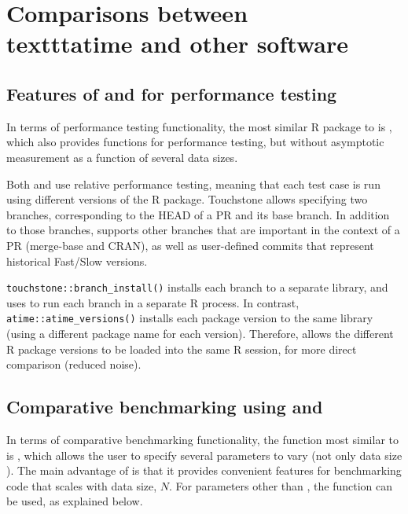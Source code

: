 \section{Comparisons between \\texttt{atime} and other software}

\subsection{Features of  and   for performance testing}

In terms of performance testing functionality, the most similar R package to  is , which also provides functions for performance testing, but without asymptotic measurement as a function of several data sizes. 

Both  and  use relative performance testing, meaning that each test case is run using different versions of the R package.
Touchstone allows specifying two branches, corresponding to the HEAD of a PR and its base branch.
In addition to those branches,  supports other branches that are important in the context of a PR (merge-base and CRAN), as well as user-defined commits that represent historical Fast/Slow versions.

\verb|touchstone::branch_install()| installs each branch to a separate library, and uses  to run each branch in a separate R process.
In contrast, \verb|atime::atime_versions()| installs each package version to the same library (using a different package name for each version).
Therefore,  allows the different R package versions to be loaded into the same R session, for more direct comparison (reduced noise).

\subsection{Comparative benchmarking using  and }

In terms of comparative benchmarking functionality, the function most similar to  is , which allows the user to specify several parameters to vary (not only data size ). 
The main advantage of  is that it provides convenient features for benchmarking code that scales with data size, $N$. 
For parameters other than , the  function can be used, as explained below.

